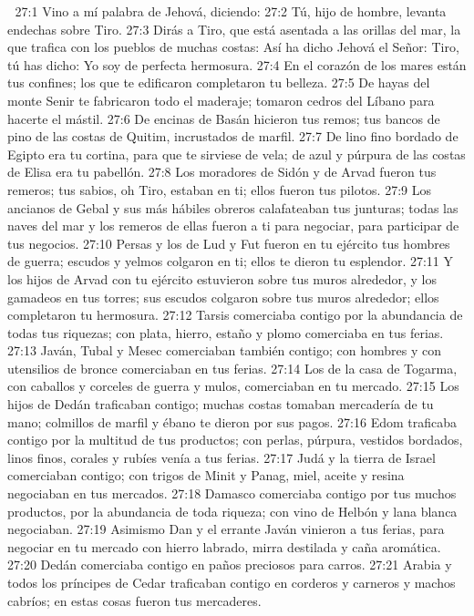 
27:1 Vino a mí palabra de Jehová, diciendo:  
27:2 Tú, hijo de hombre, levanta endechas sobre Tiro.  
27:3 Dirás a Tiro, que está asentada a las orillas del mar, la que trafica con los pueblos de muchas costas: Así ha dicho Jehová el Señor: Tiro, tú has dicho: Yo soy de perfecta hermosura.  
27:4 En el corazón de los mares están tus confines; los que te edificaron completaron tu belleza.  
27:5 De hayas del monte Senir te fabricaron todo el maderaje; tomaron cedros del Líbano para hacerte el mástil.  
27:6 De encinas de Basán hicieron tus remos; tus bancos de pino de las costas de Quitim, incrustados de marfil.  
27:7 De lino fino bordado de Egipto era tu cortina, para que te sirviese de vela; de azul y púrpura de las costas de Elisa era tu pabellón.  
27:8 Los moradores de Sidón y de Arvad fueron tus remeros; tus sabios, oh Tiro, estaban en ti; ellos fueron tus pilotos.  
27:9 Los ancianos de Gebal y sus más hábiles obreros calafateaban tus junturas; todas las naves del mar y los remeros de ellas fueron a ti para negociar, para participar de tus negocios.  
27:10 Persas y los de Lud y Fut fueron en tu ejército tus hombres de guerra; escudos y yelmos colgaron en ti; ellos te dieron tu esplendor.  
27:11 Y los hijos de Arvad con tu ejército estuvieron sobre tus muros alrededor, y los gamadeos en tus torres; sus escudos colgaron sobre tus muros alrededor; ellos completaron tu hermosura.  
27:12 Tarsis comerciaba contigo por la abundancia de todas tus riquezas; con plata, hierro, estaño y plomo comerciaba en tus ferias.  
27:13 Javán, Tubal y Mesec comerciaban también contigo; con hombres y con utensilios de bronce comerciaban en tus ferias.  
27:14 Los de la casa de Togarma, con caballos y corceles de guerra y mulos, comerciaban en tu mercado.  
27:15 Los hijos de Dedán traficaban contigo; muchas costas tomaban mercadería de tu mano; colmillos de marfil y ébano te dieron por sus pagos.  
27:16 Edom traficaba contigo por la multitud de tus productos; con perlas, púrpura, vestidos bordados, linos finos, corales y rubíes venía a tus ferias.  
27:17 Judá y la tierra de Israel comerciaban contigo; con trigos de Minit y Panag, miel, aceite y resina negociaban en tus mercados.  
27:18 Damasco comerciaba contigo por tus muchos productos, por la abundancia de toda riqueza; con vino de Helbón y lana blanca negociaban.  
27:19 Asimismo Dan y el errante Javán vinieron a tus ferias, para negociar en tu mercado con hierro labrado, mirra destilada y caña aromática.  
27:20 Dedán comerciaba contigo en paños preciosos para carros.  
27:21 Arabia y todos los príncipes de Cedar traficaban contigo en corderos y carneros y machos cabríos; en estas cosas fueron tus mercaderes.  

